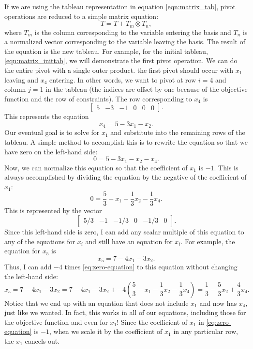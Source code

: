 If we are using the tableau representation in equation \ref{eqn:matrix_tab}, pivot operations are reduced to a simple matrix equation:
\[T = T + T_m \otimes T_n,\]
where $T_m$ is the column corresponding to the variable entering the basis and $T_n$ is a normalized vector corresponding to the variable leaving the basis.  The result of the equation is the new tableau.
For example, for the initial tableau, \ref{eqn:matrix_inittab}, we will demonstrate the first pivot operation.
We can do the entire pivot with a single outer product.
the first pivot should occur with $x_1$ leaving and $x_4$ entering.
In other words, we want to pivot at row $i = 4$ and column $j = 1$ in the tableau (the indices are offset by one because of the objective function and the row of constraints).
The row corresponding to $x_4$ is
\[
\begin{bmatrix} 5 &-3 &-1 & 0 & 0 & 0\end{bmatrix}.
\]
This represents the equation
\[
x_4 = 5 - 3x_1 - x_2.
\]
Our eventual goal is to solve for $x_1$ and substitute into the remaining rows of the tableau.
A simple method to accomplish this is to rewrite the equation so that we have zero on the left-hand side:
\[
0 = 5 - 3x_1 - x_2 - x_4.
\]
Now, we can normalize this equation so that the coefficient of $x_1$ is $-1$.
This is always accomplished by dividing the equation by the negative of the coefficient of $x_1$:
\begin{equation}
0 = \frac{5}{3} - x_1 - \frac{1}{3}x_2 - \frac{1}{3}x_4.
\label{eq:zero-equation}
\end{equation}
This is represented by the vector
\[
\begin{bmatrix} 5/3 & -1 & -1/3 & 0 & -1/3 & 0\end{bmatrix}.
\]
Since this left-hand side is zero, I can add any scalar multiple of this equation to any of the equations for $x_i$ and still have an equation for $x_i$.
For example, the equation for $x_5$ is
\[
x_5 = 7 - 4x_1 - 3x_2.
\]
Thus, I can add $-4$ times \eqref{eq:zero-equation} to this equation without changing the left-hand side:
\[ x_5 = 7 - 4x_1 - 3x_2 = 7 - 4x_1 - 3x_2 + -4\left(\frac{5}{3} - x_1 - \frac{1}{3}x_2 - \frac{1}{3}x_4\right) = \frac{1}{3} - \frac{5}{3}x_2 + \frac{4}{3} x_4.
\]
Notice that we end up with an equation that does not include $x_1$ and now has $x_4$, just like we wanted.
In fact, this works in all of our equations, including those for the objective function and even for $x_1$!
Since the coefficient of $x_1$ in \eqref{eq:zero-equation} is $-1$, when we scale it by the coefficient of $x_1$ in any particular row, the $x_1$ cancels out.
